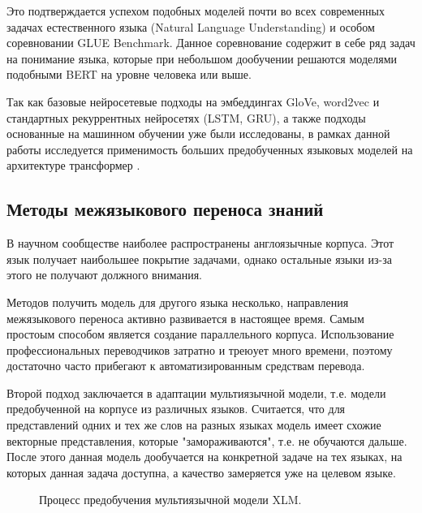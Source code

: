 Это подтверждается успехом подобных моделей почти во всех современных задачах естественного языка (Natural Language Understanding) и особом соревновании GLUE Benchmark. Данное соревнование содержит в себе ряд задач на понимание языка, которые при небольшом дообучении решаются моделями подобными BERT на уровне человека или выше.

Так как базовые нейросетевые подходы на эмбеддингах GloVe, word2vec и стандартных рекуррентных нейросетях (LSTM, GRU), а также подходы основанные на машинном обучении уже были исследованы, в рамках данной работы исследуется применимость больших предобученных языковых моделей на архитектуре трансформер \cite{vaswani2017attention}.

\subsection{Методы межязыкового переноса знаний}
В научном сообществе наиболее распространены англоязычные корпуса. Этот язык получает наибольшее покрытие задачами, однако остальные языки из-за этого не получают должного внимания.

Методов получить модель для другого языка несколько, направления межязыкового переноса активно развивается в настоящее время. Самым простоым способом является создание параллельного корпуса. Использование профессиональных переводчиков затратно и треюует много времени, поэтому достаточно часто прибегают к автоматизированным средствам перевода.

Второй подход заключается в адаптации мультиязычной модели, т.е. модели предобученной на корпусе из различных языков. Считается, что для представлений одних и тех же слов на разных языках модель имеет схожие векторные представления, которые "замораживаются", т.е. не обучаются дальше. После этого данная модель дообучается на конкретной задаче на тех языках, на которых данная задача доступна, а качество замеряется уже на целевом языке.

\begin{figure}[H]
 \caption{Процесс предобучения мультиязычной модели XLM.}
\end{figure}

